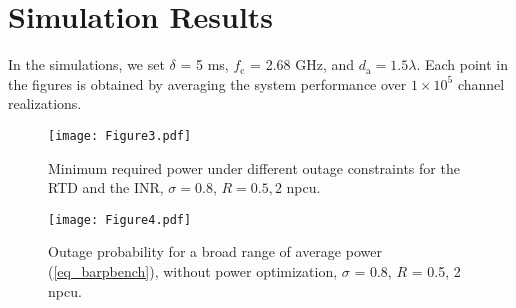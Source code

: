 










\section{{Simulation Results}}

In the simulations, we set $ \delta$ = 5 ms, $f_\text{c}$ = 2.68 GHz, and $d_\text{a} = 1.5\lambda$. Each point in the figures is obtained by averaging the system performance over $1\times10^5$ channel realizations. 

\begin{figure}
\centering
  \texttt{[image: Figure3.pdf]}\\
\caption{Minimum required power under different outage constraints for the RTD and the INR, $\sigma = 0.8$, $R = 0.5, 2$ npcu.}\label{figure3}
\end{figure}

\begin{figure}
\centering
  \texttt{[image: Figure4.pdf]}\\
\caption{Outage probability for a broad range of  average power (\ref{eq_barpbench}), without power optimization, $\sigma$ = 0.8, $R$ = 0.5, 2 npcu.}\label{figure4}
\end{figure}


